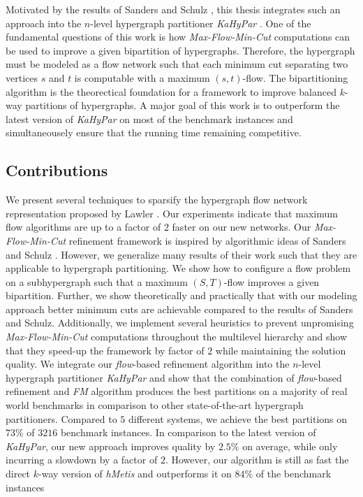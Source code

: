 Motivated by the results of Sanders and Schulz \cite{sanders2011engineering}, this thesis
integrates such an approach into the $n$-level hypergraph partitioner \emph{KaHyPar} \cite{heuer2017improving}.
One of the fundamental questions of this work is how \emph{Max-Flow-Min-Cut} computations
can be used to improve a given bipartition of hypergraphs. Therefore, the hypergraph
must be modeled as a flow network such that each minimum cut separating two vertices
$s$ and $t$ is computable with a maximum $(s,t)$-flow. The bipartitioning algorithm is 
the theorectical foundation for a framework to improve balanced $k$-way partitions of hypergraphs.
A major goal of this work is to outperform the 
latest version of \emph{KaHyPar} on most of the benchmark instances and simultaneousely
ensure that the running time remaining competitive.

\subsection{Contributions}

We present several techniques to sparsify the hypergraph flow network
representation proposed by Lawler \cite{lawler1973}. Our experiments indicate that
maximum flow algorithms are up to a factor of $2$ faster on our new networks. 
Our \emph{Max-Flow-Min-Cut} refinement framework is inspired by algorithmic ideas of
Sanders and Schulz \cite{sanders2011engineering}. However, we generalize many results of
their work such that they are applicable to hypergraph partitioning. We show how to 
configure a flow problem on a subhypergraph such that a 
maximum $(S,T)$-flow improves a given bipartition. 
Further, we show theoretically and practically that with our modeling approach 
better minimum cuts are achievable compared to the results of Sanders and Schulz.
Additionally, we implement several heuristics to prevent unpromising \emph{Max-Flow-Min-Cut} computations 
throughout the multilevel hierarchy and show that they speed-up the framework by factor
of $2$ while maintaining the solution quality.
We integrate our \emph{flow}-based refinement algorithm into the $n$-level hypergraph partitioner
\emph{KaHyPar} and show that the combination of \emph{flow}-based refinement and
\emph{FM} algorithm produces the best partitions on a majority of real world benchmarks
in comparison to other state-of-the-art hypergraph partitioners. 
Compared to $5$ different systems, we achieve the best partitions on $73\%$ 
of $3216$ benchmark instances. In comparison to the 
latest version of \emph{KaHyPar}, our new approach improves quality by
$2.5\%$ on average, while only incurring a slowdown by a factor of $2$.
However, our algorithm is still as fast the direct $k$-way
version of \emph{hMetis} and outperforms it on $84\%$ of the benchmark instances

